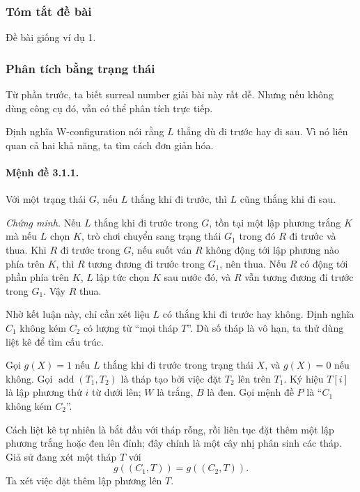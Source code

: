 \documentclass[11pt]{article}
\begin{document}
\subsubsection*{Tóm tắt đề bài}

Đề bài giống ví dụ 1.

\subsubsection*{Phân tích bằng trạng thái}

Từ phần trước, ta biết surreal number giải bài này rất dễ. Nhưng nếu không
dùng công cụ đó, vẫn có thể phân tích trực tiếp.

Định nghĩa W-configuration nói rằng \(L\) thắng dù đi trước hay đi sau. Vì nó
liên quan cả hai khả năng, ta tìm cách đơn giản hóa.

\paragraph{Mệnh đề 3.1.1.}
Với một trạng thái \(G\), nếu \(L\) thắng khi đi trước, thì \(L\) cũng thắng
khi đi sau.

\emph{Chứng minh.}
Nếu \(L\) thắng khi đi trước trong \(G\), tồn tại một lập phương trắng \(K\) mà
nếu \(L\) chọn \(K\), trò chơi chuyển sang trạng thái \(G_1\) trong đó \(R\) đi
trước và thua. Khi \(R\) đi trước trong \(G\), nếu suốt ván \(R\) không động
tới lập phương nào phía trên \(K\), thì \(R\) tương đương đi trước trong
\(G_1\), nên thua. Nếu \(R\) có động tới phần phía trên \(K\), \(L\) lập tức
chọn \(K\) sau nước đó, và \(R\) vẫn tương đương đi trước trong \(G_1\). Vậy
\(R\) thua.

Nhờ kết luận này, chỉ cần xét liệu \(L\) có thắng khi đi trước hay không. Định
nghĩa \(C_1\) không kém \(C_2\) có lượng từ ``mọi tháp \(T\)''. Dù số tháp là
vô hạn, ta thử dùng liệt kê để tìm cấu trúc.

Gọi \(g(X)=1\) nếu \(L\) thắng khi đi trước trong trạng thái \(X\), và
\(g(X)=0\) nếu không. Gọi \(\operatorname{add}(T_1,T_2)\) là tháp tạo bởi việc
đặt \(T_2\) lên trên \(T_1\). Ký hiệu \(T[i]\) là lập phương thứ \(i\) từ dưới
lên; \(W\) là trắng, \(B\) là đen. Gọi mệnh đề \(P\) là ``\(C_1\) không kém
\(C_2\)''.

Cách liệt kê tự nhiên là bắt đầu với tháp rỗng, rồi liên tục đặt thêm một lập
phương trắng hoặc đen lên đỉnh; đây chính là một cây nhị phân sinh các tháp.
Giả sử đang xét một tháp \(T\) với
\[
  g((C_1,T))=g((C_2,T)).
\]
Ta xét việc đặt thêm lập phương lên \(T\).
\end{document}
